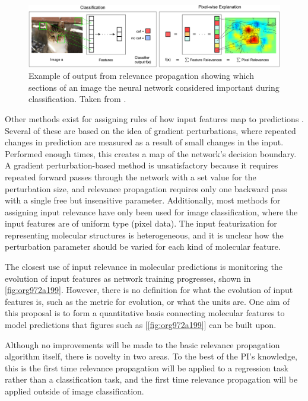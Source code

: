 \documentclass[12pt]{article}
\begin{document}
\begin{figure}[htbp]
\centering
\includegraphics[width=.9\linewidth]{2-Figure1-1.png}
\caption{\label{fig:orgea37dcb}
Example of output from relevance propagation showing which sections of an image the neural network considered important during classification. Taken from \parencite{10.1371/journal.pone.0130140}.}
\end{figure}

Other methods exist for assigning rules of how input features map to predictions \cite{Finnegan105957,2017arXiv170303717S,2016arXiv161107478L}. Several of these are based on the idea of gradient perturbations, where repeated changes in prediction are measured as a result of small changes in the input. Performed enough times, this creates a map of the network's decision boundary\cite{wiki:db}. A gradient perturbation-based method is unsatisfactory because it requires repeated forward passes through the network with a set value for the perturbation size, and relevance propagation requires only one backward pass with a single free but insensitive parameter. Additionally, most methods for assigning input relevance have only been used for image classification, where the input features are of uniform type (pixel data). The input featurization for representing molecular structures\cite{2017arXiv170205532F} is heterogeneous, and it is unclear how the perturbation parameter should be varied for each kind of molecular feature.

The closest use of input relevance in molecular predictions is monitoring the evolution of input features as network training progresses\cite{Kearnes2016}, shown in \ref{fig:org972a199}. However, there is no definition for what the evolution of input features is, such as the metric for evolution, or what the units are. One aim of this proposal is to form a quantitative basis connecting molecular features to model predictions that figures such as [\ref{fig:org972a199}] can be built upon.

Although no improvements will be made to the basic relevance propagation algorithm itself, there is novelty in two areas. To the best of the PI's knowledge, this is the first time relevance propagation will be applied to a regression task rather than a classification task, and the first time relevance propagation will be applied outside of image classification.
\end{document}
